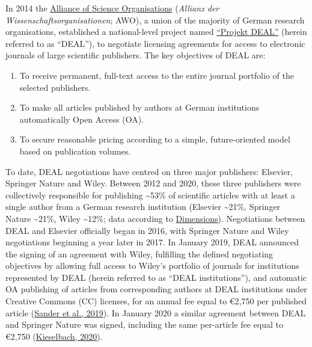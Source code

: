 \documentclass[
]{article}
\providecommand{\tightlist}{%
  \setlength{\itemsep}{0pt}\setlength{\parskip}{0pt}}
\begin{document}
In 2014 the \href{https://wissenschaftsfreiheit.de/}{Alliance of Science Organisations} (\emph{Allianz der Wissenschaftsorganisationen}; AWO), a union of the majority of German research organisations, established a national-level project named \href{https://www.projekt-deal.de}{``Projekt DEAL''} (herein referred to as ``DEAL''), to negotiate licensing agreements for access to electronic journals of large scientific publishers. The key objectives of DEAL are:

\begin{enumerate}
\def\labelenumi{\arabic{enumi}.}
\tightlist
\item
  To receive permanent, full-text access to the entire journal portfolio of the selected publishers.
\item
  To make all articles published by authors at German institutions automatically Open Access (OA).
\item
  To secure reasonable pricing according to a simple, future-oriented model based on publication volumes.
\end{enumerate}

To date, DEAL negotiations have centred on three major publishers: Elsevier, Springer Nature and Wiley. Between 2012 and 2020, these three publishers were collectively responsible for publishing \textasciitilde53\% of scientific articles with at least a single author from a German research institution (Elsevier \textasciitilde21\%, Springer Nature \textasciitilde21\%, Wiley \textasciitilde12\%; data according to \href{https://www.dimensions.ai/}{Dimensions}). Negotiations between DEAL and Elsevier officially began in 2016, with Springer Nature and Wiley negotiations beginning a year later in 2017. In January 2019, DEAL announced the signing of an agreement with Wiley, fulfilling the defined negotiating objectives by allowing full access to Wiley's portfolio of journals for institutions represented by DEAL (herein referred to as ``DEAL institutions''), and automatic OA publishing of articles from corresponding authors at DEAL institutions under Creative Commons (CC) licenses, for an annual fee equal to €2,750 per published article (\href{https://doi.org/10.17617/2.3027595}{Sander et al., 2019}). In January 2020 a similar agreement between DEAL and Springer Nature was signed, including the same per-article fee equal to €2,750 (\href{https://doi.org/10.17617/2.3174351}{Kieselbach, 2020}).
\end{document}
